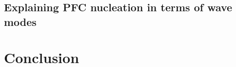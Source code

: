 \documentclass[a4paper]{article}
\begin{document}
\subsection{Explaining PFC nucleation in terms of wave modes}\label{subsec:pfc_waves}

\section{Conclusion}\label{sec:conclusion}









\end{document}
